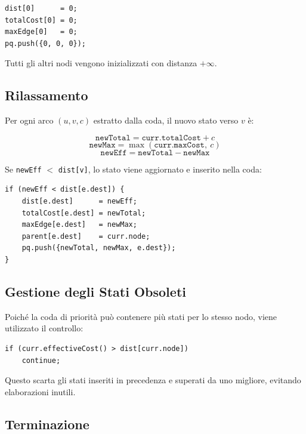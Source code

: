 \begin{lstlisting}
dist[0]      = 0;
totalCost[0] = 0;
maxEdge[0]   = 0;
pq.push({0, 0, 0});
\end{lstlisting}

Tutti gli altri nodi vengono inizializzati con distanza $+\infty$.

\subsection{Rilassamento}

Per ogni arco $(u, v, c)$ estratto dalla coda, il nuovo stato verso $v$ è:

\begin{equation}
    \texttt{newTotal} = \texttt{curr.totalCost} + c
\end{equation}
\begin{equation}
    \texttt{newMax} = \max(\texttt{curr.maxCost},\ c)
\end{equation}
\begin{equation}
    \texttt{newEff} = \texttt{newTotal} - \texttt{newMax}
\end{equation}

Se \texttt{newEff} $<$ \texttt{dist[v]}, lo stato viene aggiornato e 
inserito nella coda:

\begin{lstlisting}
if (newEff < dist[e.dest]) {
    dist[e.dest]      = newEff;
    totalCost[e.dest] = newTotal;
    maxEdge[e.dest]   = newMax;
    parent[e.dest]    = curr.node;
    pq.push({newTotal, newMax, e.dest});
}
\end{lstlisting}

\subsection{Gestione degli Stati Obsoleti}

Poiché la coda di priorità può contenere più stati per lo stesso nodo, 
viene utilizzato il controllo:

\begin{lstlisting}
if (curr.effectiveCost() > dist[curr.node])
    continue;
\end{lstlisting}

Questo scarta gli stati inseriti in precedenza e superati da uno 
migliore, evitando elaborazioni inutili.

\subsection{Terminazione}

